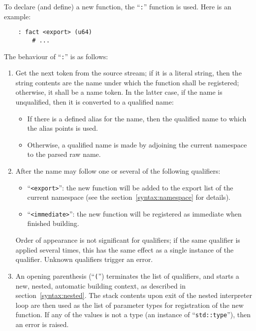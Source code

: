 To declare (and define) a new function, the ``\verb|:|'' function is
used. Here is an example:
\begin{verbatim}
    : fact <export> (u64)
        # ...
\end{verbatim}
The behaviour of ``\verb|:|'' is as follows:
\begin{enumerate}

    \item Get the next token from the source stream; if it is a literal
    string, then the string contents are the name under which the
    function shall be registered; otherwise, it shall be a name token.
    In the latter case, if the name is unqualified, then it is converted
    to a qualified name:
    \begin{itemize}

        \item If there is a defined alias for the name, then the
        qualified name to which the alias points is used.

        \item Otherwise, a qualified name is made by adjoining the current
        namespace to the parsed raw name.

    \end{itemize}

    \item After the name may follow one or several of the following
    qualifiers:
    \begin{itemize}

        \item ``\verb|<export>|'': the new function will be added to the
        export list of the current namespace (see the
        section~\ref{syntax:namespace} for details).

        \item ``\verb|<immediate>|'': the new function will be registered
        as immediate when finished building.

    \end{itemize}
    Order of appearance is not significant for qualifiers; if the same
    qualifier is applied several times, this has the same effect as
    a single instance of the qualifier. Unknown qualifiers trigger an
    error.

    \item An opening parenthesis (``\verb|(|'') terminates the list
    of qualifiers, and starts a new, nested, automatic building context,
    as described in section~\ref{syntax:nested}. The stack contents upon
    exit of the nested interpreter loop are then used as the list of
    parameter types for registration of the new function. If any of the
    values is not a type (an instance of ``\verb|std::type|''), then
    an error is raised.


\end{enumerate}
